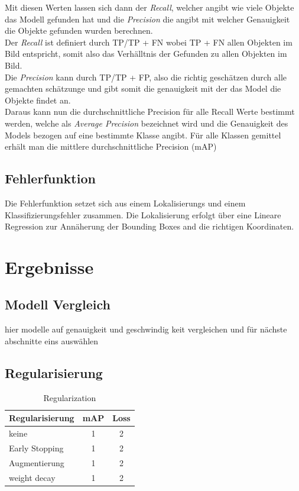 Mit diesen Werten lassen sich dann der \textit{Recall}, welcher angibt wie 
viele Objekte das Modell gefunden hat und die \textit{Precision}
die angibt mit welcher Genauigkeit die Objekte gefunden wurden
berechnen.
\\
Der \textit{Recall} ist definiert durch TP/TP + FN
wobei TP + FN allen Objekten im Bild entspricht, somit also das 
Verhälltnis der Gefunden zu allen Objekten im Bild.
\\
Die \textit{Precision} kann durch TP/TP + FP, also die richtig 
geschätzen durch alle gemachten schätzunge und gibt somit die 
genauigkeit mit der das Model die Objekte findet an.
\\
Daraus kann nun die durchschnittliche Precision für alle Recall 
Werte bestimmt werden, welche als \textit{Average Precision}
bezeichnet wird und die Genauigkeit des Models bezogen auf 
eine bestimmte Klasse angibt. Für alle Klassen gemittel 
erhält man die mittlere durchschnittliche Precision (mAP)


\subsection*{Fehlerfunktion}
Die Fehlerfunktion setzet sich aus einem Lokalisierungs und einem 
Klassifizierungsfehler zusammen. 
Die Lokalisierung erfolgt über eine Lineare Regression zur 
Annäherung der Bounding Boxes and die richtigen Koordinaten.\\

\section{Ergebnisse}\label{sec:results}

\subsection{Modell Vergleich}

hier modelle auf genauigkeit und geschwindig keit vergleichen 
und für nächste abschnitte eins auswählen



\subsection{Regularisierung}\label{subsec:regularization}

\begin{table}[htb]
    \centering
    \label{tab:regularization}
    \begin{tabular}{| l || c | c |} 
        \hline
        Regularisierung & mAP & Loss\\
        \hline
        keine & 1 & 2 \\
        \hline
        Early Stopping & 1 & 2 \\
        \hline
        Augmentierung & 1 & 2 \\
        \hline
        weight decay & 1 & 2 \\
        \hline
    \end{tabular}        
    \caption{Regularization}
\end{table}


